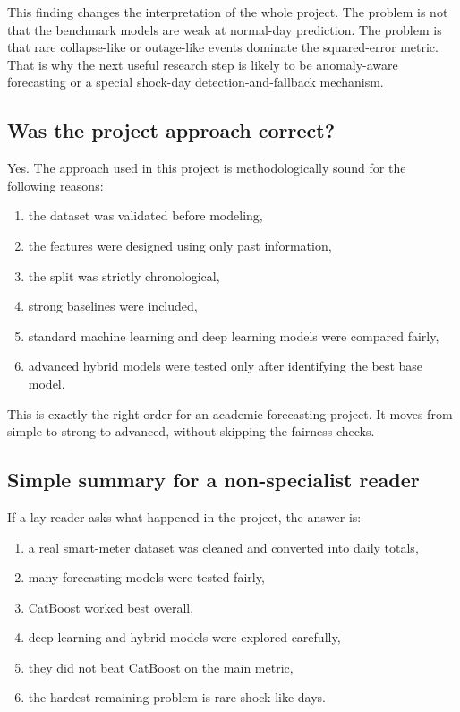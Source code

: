 \documentclass[conference]{IEEEtran}
\begin{document}
This finding changes the interpretation of the whole project. The problem is not that the benchmark models are weak at normal-day prediction. The problem is that rare collapse-like or outage-like events dominate the squared-error metric. That is why the next useful research step is likely to be anomaly-aware forecasting or a special shock-day detection-and-fallback mechanism.

\subsection{Was the project approach correct?}
Yes. The approach used in this project is methodologically sound for the following reasons:
\begin{enumerate}
\item the dataset was validated before modeling,
\item the features were designed using only past information,
\item the split was strictly chronological,
\item strong baselines were included,
\item standard machine learning and deep learning models were compared fairly,
\item advanced hybrid models were tested only after identifying the best base model.
\end{enumerate}

This is exactly the right order for an academic forecasting project. It moves from simple to strong to advanced, without skipping the fairness checks.

\subsection{Simple summary for a non-specialist reader}
If a lay reader asks what happened in the project, the answer is:
\begin{enumerate}
\item a real smart-meter dataset was cleaned and converted into daily totals,
\item many forecasting models were tested fairly,
\item CatBoost worked best overall,
\item deep learning and hybrid models were explored carefully,
\item they did not beat CatBoost on the main metric,
\item the hardest remaining problem is rare shock-like days.
\end{enumerate}
\end{document}
